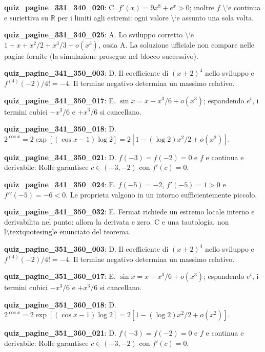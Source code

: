 \documentclass[11pt,a4paper]{article}
\newcounter{quiz}
\begin{document}
\noindent\textbf{quiz\_pagine\_331\_340\_020}: C. $f\prime(x)=9x^8+e^x>0$; inoltre $f$ \textbackslash{}`e continua e suriettiva su $\mathbb R$ per i limiti agli estremi: ogni valore \textbackslash{}`e assunto una sola volta.\par\medskip
\noindent\textbf{quiz\_pagine\_331\_340\_025}: A. Lo sviluppo corretto \textbackslash{}`e $1+x+x^2/2+x^3/3+o(x^3)$, ossia A. La soluzione ufficiale non compare nelle pagine fornite (la simulazione prosegue nel blocco successivo).\par\medskip
\noindent\textbf{quiz\_pagine\_341\_350\_003}: D. Il coefficiente di $(x+2)^4$ nello sviluppo e $f^{(4)}(-2)/4!=-4$. Il termine negativo determina un massimo relativo.\par\medskip
\noindent\textbf{quiz\_pagine\_341\_350\_017}: E. $\sin x=x-x^3/6+o(x^3)$; espandendo $e^t$, i termini cubici $-x^3/6$ e $+x^3/6$ si cancellano.\par\medskip
\noindent\textbf{quiz\_pagine\_341\_350\_018}: D. $2^{\cos x}=2\exp[(\cos x-1)\log2]=2[1-(\log2)x^2/2+o(x^2)]$.\par\medskip
\noindent\textbf{quiz\_pagine\_341\_350\_021}: D. $f(-3)=f(-2)=0$ e $f$ e continua e derivabile: Rolle garantisce $c\in(-3,-2)$ con $f\prime(c)=0$.\par\medskip
\noindent\textbf{quiz\_pagine\_341\_350\_024}: E. $f(-5)=-2$, $f\prime(-5)=1>0$ e $f\prime\prime(-5)=-6<0$. Le proprieta valgono in un intorno sufficientemente piccolo.\par\medskip
\noindent\textbf{quiz\_pagine\_341\_350\_032}: E. Fermat richiede un estremo locale interno e derivabilita nel punto: allora la derivata e zero. C e una tautologia, non l\textbackslash{}textquotesingle enunciato del teorema.\par\medskip
\noindent\textbf{quiz\_pagine\_351\_360\_003}: D. Il coefficiente di $(x+2)^4$ nello sviluppo e $f^{(4)}(-2)/4!=-4$. Il termine negativo determina un massimo relativo.\par\medskip
\noindent\textbf{quiz\_pagine\_351\_360\_017}: E. $\sin x=x-x^3/6+o(x^3)$; espandendo $e^t$, i termini cubici $-x^3/6$ e $+x^3/6$ si cancellano.\par\medskip
\noindent\textbf{quiz\_pagine\_351\_360\_018}: D. $2^{\cos x}=2\exp[(\cos x-1)\log2]=2[1-(\log2)x^2/2+o(x^2)]$.\par\medskip
\noindent\textbf{quiz\_pagine\_351\_360\_021}: D. $f(-3)=f(-2)=0$ e $f$ e continua e derivabile: Rolle garantisce $c\in(-3,-2)$ con $f\prime(c)=0$.\par\medskip
\end{document}
